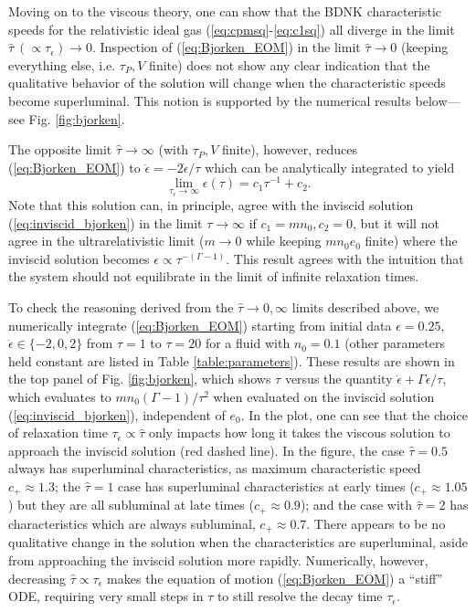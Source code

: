 \documentclass[%
notitlepage,
superscriptaddress,
nofootinbib,
amsmath,
amssymb,
aps,
twocolumn
]{revtex4-1}
\begin{document}
Moving on to the viscous theory, one can show that the BDNK characteristic
speeds for the relativistic ideal gas (\ref{eq:cpmsq}-\ref{eq:c1sq}) all
diverge in the limit ${\hat{\tau} ~(\propto \tau_{\epsilon}) \to 0}$.
Inspection of (\ref{eq:Bjorken_EOM}) in the limit 
$\hat{\tau} \to 0$
(keeping everything else, 
i.e. $\tau_{P}, V$
finite)
does not show any clear indication that the qualitative behavior of the solution will change when the characteristic speeds become superluminal.  This notion is supported by the numerical results below---see Fig. \ref{fig:bjorken}. 

The opposite limit 
$\hat{\tau} \to \infty$ (with $\tau_{P}, V$ finite),
however, reduces (\ref{eq:Bjorken_EOM}) to $\ddot{\epsilon} = -2 \dot{\epsilon}/\tau$ which can be analytically integrated to yield
\begin{equation}\label{eq_tau_inf}
\lim\limits_{\tau_{\epsilon} \to \infty} \epsilon(\tau) = c_1 \tau^{-1} + c_2.
\end{equation}
Note that this solution can, in principle, agree with the inviscid solution (\ref{eq:inviscid_bjorken}) in the limit $\tau \to \infty$ if $c_1 = m n_0, c_2 = 0$, but it will not agree in the ultrarelativistic limit ($m \to 0$ while keeping $m n_0 e_0$ finite) where the inviscid solution becomes $\epsilon \propto \tau^{-(\Gamma - 1)}$.  This result agrees with the intuition that the system should not equilibrate in the limit of infinite relaxation times.

To check the reasoning derived from the 
$\hat{\tau} \to 0, \infty$
limits described above, we numerically integrate (\ref{eq:Bjorken_EOM})
starting from initial data $\epsilon = 0.25$, $\dot{\epsilon} \in \{-2, 0,
2\}$ from $\tau = 1$ to $\tau = 20$ for a fluid with $n_0 = 0.1$ (other
parameters held constant are listed in Table \ref{table:parameters}).
These results are shown in the top panel of Fig. \ref{fig:bjorken}, which shows 
$\tau$ versus the quantity
$\dot{\epsilon} + \Gamma \epsilon/\tau$, which
evaluates to $m n_0 (\Gamma - 1)/\tau^2$ when evaluated on the inviscid
solution (\ref{eq:inviscid_bjorken}), independent of $e_0$.  In the plot,
one can see that the choice of relaxation time $\tau_{\epsilon} \propto
\hat{\tau}$ only impacts how long it takes the viscous solution to approach
the inviscid solution (red dashed line).  In the figure, the case
$\hat{\tau} = 0.5$ always has superluminal characteristics, as maximum
characteristic speed $c_+ \approx 1.3$; the $\hat{\tau} = 1$ case has
superluminal characteristics at early times ($c_+ \approx 1.05$) but
they are all subluminal at late times ($c_+ \approx 0.9$); and the
case with $\hat{\tau} = 2$ has characteristics which are always
subluminal, $c_+ \approx 0.7$.  There appears to be no qualitative change
in the solution when the characteristics are superluminal, aside from
approaching the inviscid solution more rapidly.  Numerically, however,
decreasing $\hat{\tau} \propto \tau_{\epsilon}$ makes the equation of
motion (\ref{eq:Bjorken_EOM}) a ``stiff'' ODE, requiring very small steps
in $\tau$ to still resolve the decay time $\tau_\epsilon$.
\end{document}
